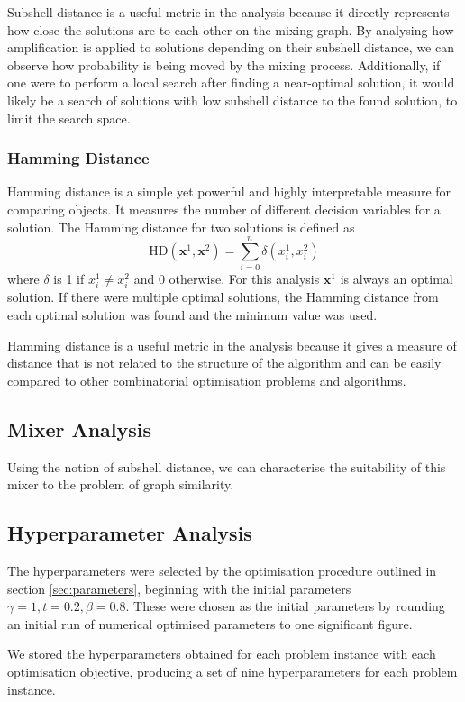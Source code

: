 Subshell distance is a useful metric in the analysis because it directly represents how close the solutions are to each other on the mixing graph. By analysing how amplification is applied to solutions depending on their subshell distance, we can observe how probability is being moved by the mixing process. Additionally, if one were to perform a local search after finding a near-optimal solution, it would likely be a search of solutions with low subshell distance to the found solution, to limit the search space.

\subsubsection{Hamming Distance}
Hamming distance is a simple yet powerful and highly interpretable measure for comparing objects. It measures the number of different decision variables for a solution. The Hamming distance for two solutions is defined as 
$$\text{HD}(\mathbf{x}^1,\mathbf{x}^2)=\sum_{i=0}^n \delta(x^1_i,x^2_i)$$
where $\delta$ is 1 if $x^1_i\neq x^2_i$ and 0 otherwise. For this analysis $\mathbf{x}^1$ is always an optimal solution. If there were multiple optimal solutions, the Hamming distance from each optimal solution was found and the minimum value was used.

Hamming distance is a useful metric in the analysis because it gives a measure of distance that is not related to the structure of the algorithm and can be easily compared to other combinatorial optimisation problems and algorithms.

\subsection{Mixer Analysis}
Using the notion of subshell distance, we can characterise the suitability of this mixer to the problem of graph similarity. 


\subsection{Hyperparameter Analysis}
The hyperparameters were selected by the optimisation procedure outlined in section \ref{sec:parameters}, beginning with the initial parameters $\gamma=1, t=0.2, \beta=0.8$. These were chosen as the initial parameters by rounding an initial run of numerical optimised parameters to one significant figure.

We stored the hyperparameters obtained for each problem instance with each optimisation objective, producing a set of nine hyperparameters for each problem instance.